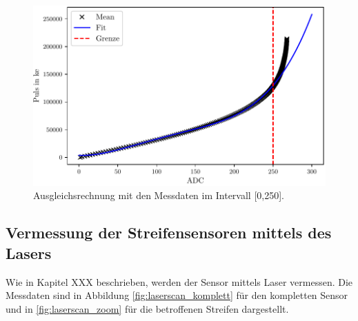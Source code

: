 \begin{figure}[H]
  \centering
  \includegraphics{build/Calib_fit.pdf}
  \caption{Ausgleichsrechnung mit den Messdaten im Intervall [0,250].}
  \label{fig:calib_fit}
\end{figure}

\subsection{Vermessung der Streifensensoren mittels des Lasers}

Wie in Kapitel XXX beschrieben, werden der Sensor mittels Laser vermessen. Die Messdaten sind in Abbildung \ref{fig:laserscan_komplett} für den kompletten Sensor und in \ref{fig:laserscan_zoom} für die betroffenen Streifen dargestellt. 

